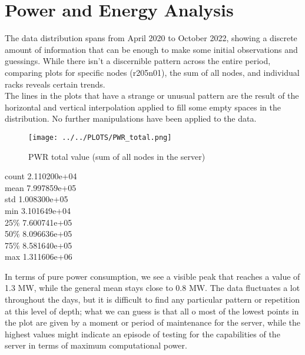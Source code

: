 \section{Power and Energy Analysis}
\noindent
The data distribution spans from April 2020 to October 2022, showing a discrete amount of information that can be enough to make some initial observations and guessings. While there isn't a discernible pattern across the entire period, comparing plots for specific nodes (r205n01), the sum of all nodes, and individual racks reveals certain trends. \\
The lines in the plots that have a strange or unusual pattern are the result of the horizontal and vertical interpolation applied to fill some empty spaces in the distribution. No further manipulations have been applied to the data.

\vspace{-15pt}

\begin{figure}[H]
\centering
\texttt{[image: ../../PLOTS/PWR\_total.png]}
\captionsetup{skip=-10pt}
\caption{PWR total value (sum of all nodes in the server)}
\label{fig:PWR_total}
\end{figure}

\begin{center}
count    2.110200e+04 \\
mean     7.997859e+05 \\
std      1.008300e+05 \\
min      3.101649e+04 \\
25\%      7.600741e+05 \\
50\%      8.096636e+05 \\
75\%      8.581640e+05 \\
max      1.311606e+06
\end{center}

In terms of pure power consumption, we see a visible peak that reaches a value of 1.3 MW, while the general mean stays close to 0.8 MW. The data fluctuates a lot throughout the days, but it is difficult to find any particular pattern or repetition at this level of depth; what we can guess is that all o most of the lowest points in the plot are given by a moment or period of maintenance for the server, while the highest values might indicate an episode of testing for the capabilities of the server in terms of maximum computational power.

\vspace{-15pt}

